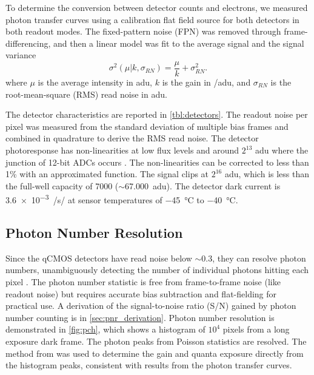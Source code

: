 To determine the conversion between detector counts and electrons, we measured photon transfer curves using a calibration flat field source for both detectors in both readout modes. The fixed-pattern noise (FPN) was removed through frame-differencing, and then a linear model was fit to the average signal and the signal variance \citep{janesick_photon_2007,stefanov_cmos_2022}
\begin{equation}
    \sigma^2\left(\mu | k, \sigma_{RN}\right) = \frac{\mu}{k} + \sigma^2_{RN}.
\end{equation}
where $\mu$ is the average intensity in \si{adu}, $k$ is the gain in \si{\electron/adu}, and $\sigma_{RN}$ is the root-mean-square (RMS) read noise in \si{adu}.

The detector characteristics are reported in \autoref{tbl:detectors}. The readout noise per pixel was measured from the standard deviation of multiple bias frames and combined in quadrature to derive the RMS read noise. The detector photoresponse has non-linearities at low flux levels and around $2^{13}$ adu where the junction of 12-bit ADCs occurs \citep[see][]{strakhov_speckle_2023}. The non-linearities can be corrected to less than 1\% with an approximated function. The signal clips at $2^{16}$ adu, which is less than the full-well capacity of \SI{7000}{\electron} ($\sim$\SI{67,000}{adu}). The detector dark current is \SI{3.6e-3}{\electron/\second/\pixel} at sensor temperatures of \SI{-45}{\celsius} to \SI{-40}{\celsius}.

\subsection{Photon Number Resolution}

Since the qCMOS detectors have read noise below $\sim$\SI{0.3}{\electron}, they can resolve photon numbers, unambiguously detecting the number of individual photons hitting each pixel  \citep{starkey_determining_2016}. The photon number statistic is free from frame-to-frame noise (like readout noise) but requires accurate bias subtraction and flat-fielding for practical use. A derivation of the signal-to-noise ratio (S/N) gained by photon number counting is in \autoref{sec:pnr_derivation}. Photon number resolution is demonstrated in \autoref{fig:pch}, which shows a histogram of $10^4$ pixels from a long exposure dark frame. The photon peaks from Poisson statistics are resolved. The method from \citet{starkey_determining_2016} was used to determine the gain and quanta exposure directly from the histogram peaks, consistent with results from the photon transfer curves.

